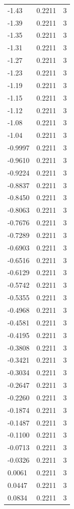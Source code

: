 \begin{longtable}{lrr}
  -1.43 & 0.2211 & 3 \\
  -1.39 & 0.2211 & 3 \\
  -1.35 & 0.2211 & 3 \\
  -1.31 & 0.2211 & 3 \\
  -1.27 & 0.2211 & 3 \\
  -1.23 & 0.2211 & 3 \\
  -1.19 & 0.2211 & 3 \\
  -1.15 & 0.2211 & 3 \\
  -1.12 & 0.2211 & 3 \\
  -1.08 & 0.2211 & 3 \\
  -1.04 & 0.2211 & 3 \\
  -0.9997 & 0.2211 & 3 \\
  -0.9610 & 0.2211 & 3 \\
  -0.9224 & 0.2211 & 3 \\
  -0.8837 & 0.2211 & 3 \\
  -0.8450 & 0.2211 & 3 \\
  -0.8063 & 0.2211 & 3 \\
  -0.7676 & 0.2211 & 3 \\
  -0.7289 & 0.2211 & 3 \\
  -0.6903 & 0.2211 & 3 \\
  -0.6516 & 0.2211 & 3 \\
  -0.6129 & 0.2211 & 3 \\
  -0.5742 & 0.2211 & 3 \\
  -0.5355 & 0.2211 & 3 \\
  -0.4968 & 0.2211 & 3 \\
  -0.4581 & 0.2211 & 3 \\
  -0.4195 & 0.2211 & 3 \\
  -0.3808 & 0.2211 & 3 \\
  -0.3421 & 0.2211 & 3 \\
  -0.3034 & 0.2211 & 3 \\
  -0.2647 & 0.2211 & 3 \\
  -0.2260 & 0.2211 & 3 \\
  -0.1874 & 0.2211 & 3 \\
  -0.1487 & 0.2211 & 3 \\
  -0.1100 & 0.2211 & 3 \\
  -0.0713 & 0.2211 & 3 \\
  -0.0326 & 0.2211 & 3 \\
  0.0061 & 0.2211 & 3 \\
  0.0447 & 0.2211 & 3 \\
  0.0834 & 0.2211 & 3 \\

\end{longtable}
